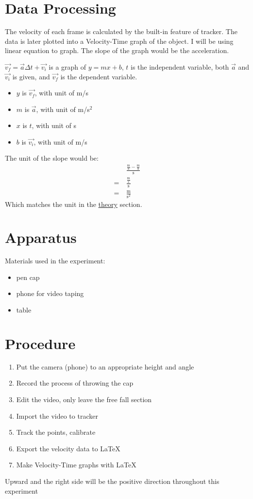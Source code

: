 \documentclass{article}
\begin{document}
\section{Data Processing}
The velocity of each frame is calculated by the built-in feature of tracker. The data is later plotted into a Velocity-Time graph of the object. I will be using linear equation to graph. The slope of the graph would be the acceleration.



$\Vec{v_f}=\Vec{a}\Delta t+\Vec{v_i}$ is a graph of $y=mx+b$, $t$ is the independent variable, both $\Vec{a}$ and $\Vec{v_i}$ is given, and $\Vec{v_f}$ is the dependent variable.\\
\begin{itemize}
    \item $y$ is $\Vec{v_f}$, with unit of m/s
    \item $m$ is $\Vec a$, with unit of m/s$^2$
    \item $x$ is $t$, with unit of s
    \item $b$ is $\Vec{v_i}$, with unit of m/s
\end{itemize}

The unit of the slope would be:
\begin{align*}
    &\frac{\frac{\text{m}}{\text{s}}-\frac{\text{m}}{\text{s}}}{\text{s}}\\
    =\ &\frac{\frac{\text{m}}{\text{s}}}{\text{s}}\\
    =\ &\frac{\text{m}}{\text{s}^2}
\end{align*}
Which matches the unit in the \hyperref[theory]{theory} section. 



\pagebreak
\section{Apparatus}
Materials used in the experiment:
\begin{itemize}
    \item pen cap
    \item phone for video taping
    \item table
\end{itemize}

\section{Procedure}
\begin{enumerate}
    \item Put the camera (phone) to an appropriate height and angle
    \item Record the process of throwing the cap
    \item Edit the video, only leave the free fall section
    \item Import the video to tracker
    \item Track the points, calibrate
    \item Export the velocity data to \LaTeX
    \item Make Velocity-Time graphs with \LaTeX 
\end{enumerate}
Upward and the right side will be the positive direction throughout this experiment
\end{document}
